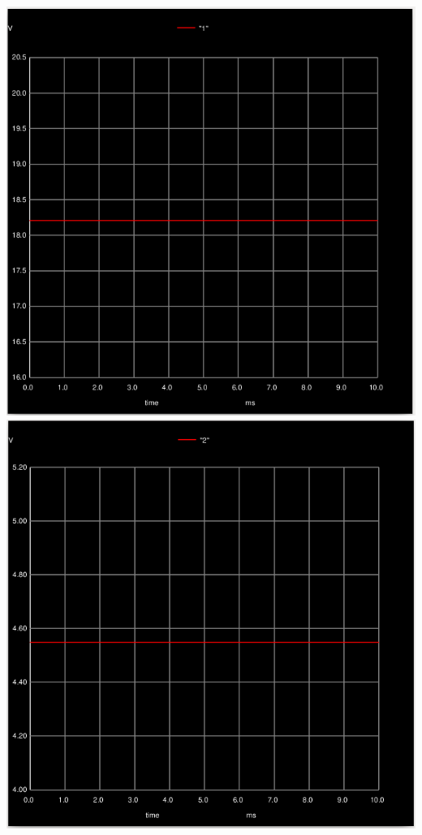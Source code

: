 \documentclass[12pt,a4paper]{report}
\begin{document}
\begin{itemize}
          \includegraphics[scale=0.35]{P10_P11_atteliUNtabulas/voltage_divider_Vnode1.png} \includegraphics[scale=0.35]{P10_P11_atteliUNtabulas/voltage_divider_Vnode2.png}
\end{itemize}
\end{document}
